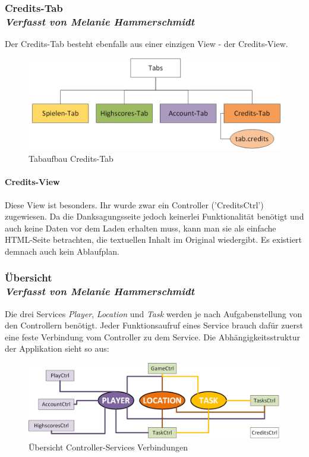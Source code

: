 \subsubsection[Credits-Tab]{Credits-Tab
 \\ \textnormal{\small{\textit {Verfasst von Melanie Hammerschmidt}}}}
 
Der Credits-Tab besteht ebenfalls aus einer einzigen View - der Credits-View.
\begin{figure}[h]
\centering
\includegraphics[width=1\textwidth]{ref/images/tabs_credits.png}
\caption[Tabaufbau Credits-Tab]{Tabaufbau Credits-Tab}
\label{fig:Tabaufbau Credits-Tab}
\end{figure}

\paragraph{Credits-View}
%
%
Diese View ist besonders. Ihr wurde zwar ein Controller ('CreditsCtrl') zugewiesen. Da die Danksagungsseite jedoch keinerlei Funktionalität benötigt und auch keine Daten vor dem Laden erhalten muss, kann man sie als einfache HTML-Seite betrachten, die textuellen Inhalt im Original wiedergibt. Es existiert demnach auch kein Ablaufplan.
\newpage
\subsubsection[Übersicht]{Übersicht
 \\ \textnormal{\small{\textit {Verfasst von Melanie Hammerschmidt}}}}
 
Die drei Services \emph{Player}, \emph{Location} und \emph{Task} werden je nach Aufgabenstellung von den Controllern benötigt. Jeder Funktionsaufruf eines Service brauch dafür zuerst eine feste Verbindung vom Controller zu dem Service. Die Abhängigkeitsstruktur der Applikation sieht so aus:
\begin{figure}[h]
\centering
\includegraphics[width=1\textwidth]{ref/images/controller_services.png}
\caption[Übersicht Controller-Services Verbindungen]{Übersicht Controller-Services Verbindungen}
\label{fig:Controller-Services}
\end{figure} 

